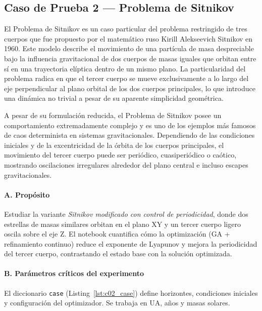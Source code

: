 \subsection{Caso de Prueba 2 — Problema de Sitnikov}

El Problema de Sitnikov es un caso particular del problema restringido de tres cuerpos que fue propuesto por el matemático ruso Kirill Alekseevich Sitnikov en 1960. Este modelo describe el movimiento de una partícula de masa despreciable bajo la influencia gravitacional de dos cuerpos de masas iguales que orbitan entre sí en una trayectoria elíptica dentro de un mismo plano. La particularidad del problema radica en que el tercer cuerpo se mueve exclusivamente a lo largo del eje perpendicular al plano orbital de los dos cuerpos principales, lo que introduce una dinámica no trivial a pesar de su aparente simplicidad geométrica.

A pesar de su formulación reducida, el Problema de Sitnikov posee un comportamiento extremadamente complejo y es uno de los ejemplos más famosos de caos determinista en sistemas gravitacionales. Dependiendo de las condiciones iniciales y de la excentricidad de la órbita de los cuerpos principales, el movimiento del tercer cuerpo puede ser periódico, cuasiperiódico o caótico, mostrando oscilaciones irregulares alrededor del plano central e incluso escapes gravitacionales.

\paragraph{A. Propósito}
Estudiar la variante \emph{Sitnikov modificado con control de periodicidad}, donde dos estrellas de masas similares orbitan en el plano XY y un tercer cuerpo ligero oscila sobre el eje Z. El notebook cuantifica cómo la optimización (GA + refinamiento continuo) reduce el exponente de Lyapunov y mejora la periodicidad del tercer cuerpo, contrastando el estado base con la solución optimizada.

\paragraph{B. Parámetros críticos del experimento}
El diccionario \texttt{case} (Listing~\ref{lst:c02_case}) define horizontes, condiciones iniciales y configuración del optimizador. Se trabaja en UA, años y masas solares.

